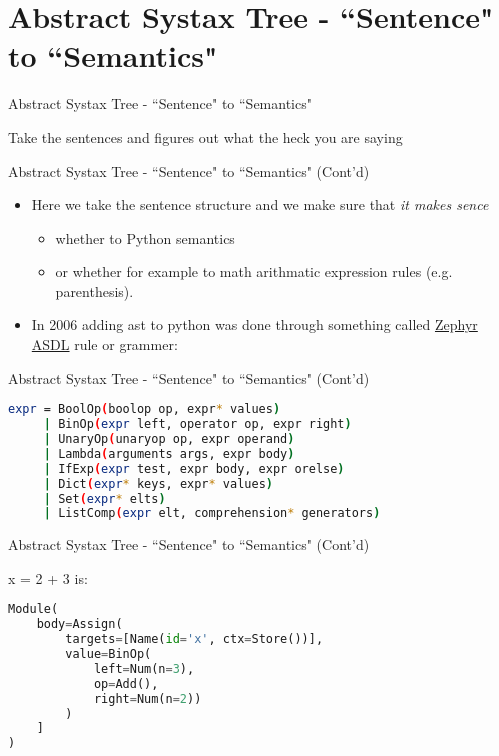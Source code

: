 \section{Abstract Systax Tree - ``Sentence" to ``Semantics"}
\begin{frame}{Abstract Systax Tree - ``Sentence" to ``Semantics"}
\begin{itemize}
{\LARGE \item[-] Take the sentences and figures out what the heck you are saying}
\end{itemize}
\end{frame}

\begin{frame}{Abstract Systax Tree - ``Sentence" to ``Semantics" (Cont'd)}
\begin{itemize}
\item[-]<1-> Here we take the sentence structure and we make sure that \textit{it makes sence}

\begin{itemize}
    \item<2-> whether to Python
    semantics
    \item<3-> or whether for example to math arithmatic expression rules (e.g. parenthesis).
\end{itemize}

\item[-]<4> In 2006 adding ast to python was done through something called \href{https://asdl.sourceforge.net/}{Zephyr ASDL} rule or grammer: 
\end{itemize}
\end{frame}

\begin{frame}[fragile]{Abstract Systax Tree - ``Sentence" to ``Semantics" (Cont'd)}
\begin{flushleft}
\begin{lstlisting}[language=bash]
expr = BoolOp(boolop op, expr* values)
     | BinOp(expr left, operator op, expr right)
     | UnaryOp(unaryop op, expr operand)
     | Lambda(arguments args, expr body)
     | IfExp(expr test, expr body, expr orelse)
     | Dict(expr* keys, expr* values)
     | Set(expr* elts)
     | ListComp(expr elt, comprehension* generators)
\end{lstlisting}
\end{flushleft}
\end{frame}

\begin{frame}[fragile]{Abstract Systax Tree - ``Sentence" to ``Semantics" (Cont'd)}
\begin{flushleft}
{\ttfamily x = 2 + 3} is:
\begin{lstlisting}[language=python]
Module(
    body=Assign(
        targets=[Name(id='x', ctx=Store())], 
        value=BinOp(
            left=Num(n=3), 
            op=Add(), 
            right=Num(n=2))
        )
    ]
)
\end{lstlisting}
\end{flushleft}
\end{frame}
